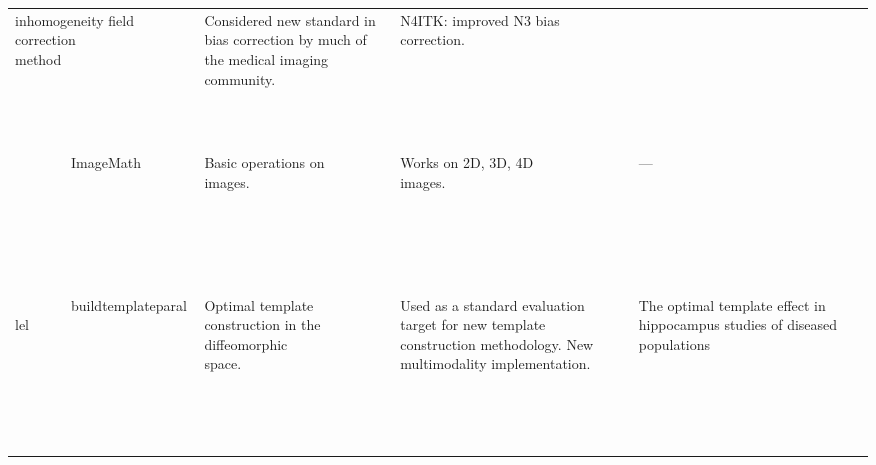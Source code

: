 \documentclass[18pt]{beamer}
\begin{document}
\begin{frame}
\begin{tiny}
{\begin{table}
\begin{tabular}{|p{2.0cm}|p{2.5cm}|p{3cm}|p{3cm}|}
inhomogeneity field correction
method                                                                                                                   
& Considered new standard in bias correction by much of the medical imaging community.                       & N4ITK: improved N3 bias correction.                                                                                                                                                                 \\ 
        ImageMath                                     & Basic operations on images.                                                                                                                                    & Works on 2D, 3D, 4D images.                                                                                        & ---                                                                                                                                                                                             \\ 
        buildtemplateparallel                         & Optimal template construction in the diffeomorphic space.                                                                                                      & Used as a standard evaluation target for new template construction methodology.  New multimodality implementation. & The optimal template effect in hippocampus studies of diseased populations                                                                                                                          \\ 
\hline
\end{tabular}
\end{table}
}
\end{tiny}
\end{frame}
\end{document}
